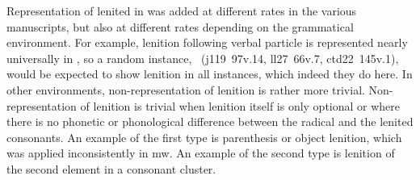 
Representation of lenited  in  was added at different rates in the various manuscripts, but also at different rates depending on the grammatical environment. For example, lenition following verbal particle  is represented nearly universally in , so a random instance, \eg {}~(\gls{j119}~97v.14, \gls{ll27}~66v.7, \gls{ctd22}~145v.1), would be expected to show lenition in all instances, which indeed they do here.
In other environments, non-representation  of lenition is rather more trivial. Non-representation of lenition is trivial when lenition itself is only optional or where there is no phonetic or phonological difference between the radical and the lenited consonants. An example of the first type is parenthesis or object lenition, which was applied inconsistently in \gls{mw}. An example of the second type is lenition of the second element in a  consonant cluster.
